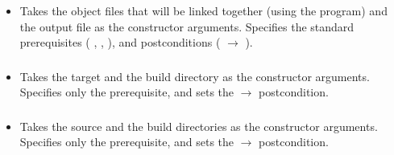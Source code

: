\subsubsection*{}\label{subsec:Link}

\begin{itemize}[label={}]
    \item Takes the object files that will be linked together (using the  program) and the output file as the
          constructor arguments.
          Specifies the standard prerequisites (
          \hyperref[subsec:ProgramExistsPrerequisite]{},
          \hyperref[subsec:FileExistsPrerequisite]{},
          \hyperref[subsec:NonEmptyListPrerequisite]{}
          ), and postconditions (
          \hyperref[subsec:ExitCodePostcondition]{} $\rightarrow$ 
          ).
\end{itemize}

\subsubsection*{}\label{subsec:Make}

\begin{itemize}[label={}]
    \item Takes the target and the build directory as the constructor arguments.
          Specifies only the \hyperref[subsec:ProgramExistsPrerequisite]{}
          prerequisite, and sets the
          \hyperref[subsec:ExitCodePostcondition]{} $\rightarrow$ 
          postcondition.
\end{itemize}

\subsubsection*{}\label{subsec:CMake}

\begin{itemize}[label={}]
    \item Takes the source and the build directories as the constructor arguments.
          Specifies only the \hyperref[subsec:ProgramExistsPrerequisite]{}
          prerequisite, and sets the
          \hyperref[subsec:ExitCodePostcondition]{} $\rightarrow$ 
          postcondition.
\end{itemize}

